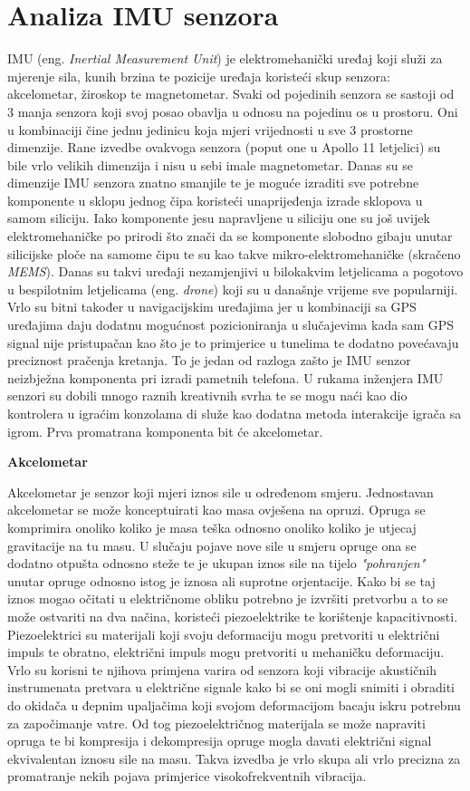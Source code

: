 \documentclass[times, utf8, diplomski]{fer}
\begin{document}
\section{Analiza IMU senzora}
IMU (eng. \textit{Inertial Measurement Unit}) je elektromehanički uređaj koji služi za mjerenje sila, kunih brzina te pozicije
uređaja koristeći skup senzora: akcelometar, žiroskop te magnetometar. Svaki od pojedinih senzora se sastoji od 3 manja senzora
koji svoj posao obavlja u odnosu na pojedinu os u prostoru. Oni u kombinaciji čine jednu jedinicu koja mjeri vrijednosti u sve 
3 prostorne dimenzije. Rane izvedbe ovakvoga senzora (poput one u Apollo 11 letjelici) su bile vrlo velikih dimenzija i nisu
u sebi imale magnetometar. Danas su se dimenzije IMU senzora znatno smanjile te je moguće izraditi sve potrebne komponente u
sklopu jednog čipa koristeći unaprijeđenja izrade sklopova u samom siliciju. Iako komponente jesu napravljene u siliciju one su
još uvijek elektromehaničke po prirodi što znači da se komponente slobodno gibaju unutar silicijske ploče na samome čipu
te su kao takve mikro-elektromehaničke (skračeno \textit{MEMS}). Danas su takvi uređaji nezamjenjivi u bilokakvim letjelicama a
pogotovo u bespilotnim letjelicama (eng. \textit{drone}) koji su u današnje vrijeme sve popularniji. Vrlo su bitni također u
navigacijskim uređajima jer u kombinaciji sa GPS uređajima daju dodatnu mogućnost pozicioniranja u slučajevima kada sam GPS signal
nije pristupačan kao što je to primjerice u tunelima te dodatno povećavaju preciznost pračenja kretanja. To je jedan od razloga
zašto je IMU senzor neizbježna komponenta pri izradi pametnih telefona. U rukama inženjera IMU senzori su dobili mnogo raznih 
kreativnih svrha te se mogu naći kao dio kontrolera u igraćim konzolama di služe kao dodatna metoda interakcije igrača sa igrom.
Prva promatrana komponenta bit će akcelometar.

\textbf{Akcelometar}

Akcelometar je senzor koji mjeri iznos sile u određenom smjeru. Jednostavan akcelometar se može konceptuirati kao masa ovješena na 
opruzi. Opruga se komprimira onoliko koliko je masa teška odnosno onoliko koliko je utjecaj gravitacije na tu masu. U slučaju
pojave nove sile u smjeru opruge ona se dodatno otpušta odnosno steže te je ukupan iznos sile na tijelo \textit{"pohranjen"}
unutar opruge odnosno istog je iznosa ali suprotne orjentacije. Kako bi se taj iznos mogao očitati u električnome obliku potrebno
je izvršiti pretvorbu a to se može ostvariti na dva načina, koristeći piezoelektrike te korištenje kapacitivnosti. Piezoelektrici
su materijali koji svoju deformaciju mogu pretvoriti u električni impuls te obratno, električni impuls mogu pretvoriti u mehaničku
deformaciju. Vrlo su korisni te njihova primjena varira od senzora koji vibracije akustičnih instrumenata pretvara u električne
signale kako bi se oni mogli snimiti i obraditi do okidača u đepnim upaljačima koji svojom deformacijom bacaju iskru potrebnu za
započimanje vatre. Od tog piezoelektričnog materijala se može napraviti opruga te bi kompresija i dekompresija opruge mogla davati
električni signal ekvivalentan iznosu sile na masu. Takva izvedba je vrlo skupa ali vrlo precizna za promatranje nekih pojava 
primjerice visokofrekventnih vibracija.
\end{document}
